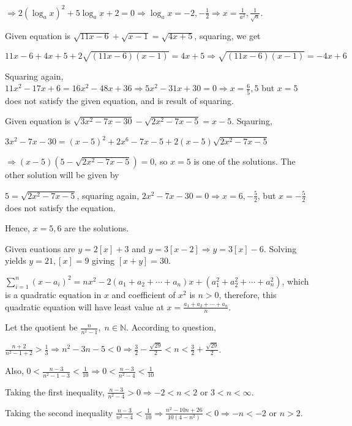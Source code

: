   $\Rightarrow 2(\log_ax)^2 + 5\log_ax + 2 = 0 \Rightarrow \log_ax = -2, -\frac{1}{2}\Rightarrow x =
  \frac{1}{a^2}, \frac{1}{\sqrt{a}}$.
\item Given equation is $\sqrt{11x - 6} + \sqrt{x - 1} = \sqrt{4x + 5}$, squaring, we get

  $11x - 6 + 4x + 5 + 2\sqrt{(11x - 6)(x - 1)} = 4x + 5 \Rightarrow \sqrt{(11x - 6)(x - 1)} = -4x + 6$

  Squaring again, $11x^2 - 17x + 6 = 16x^2 - 48x + 36 \Rightarrow 5x^2 - 31x + 30 = 0\Rightarrow x =
  \frac{6}{5}, 5$ but $x = 5$ does not satisfy the given equation, and is result of squaring.
\item Given equation is $\sqrt{3x^2 - 7x - 30} - \sqrt{2x^2 - 7x - 5} = x - 5$. Sqauring,

  $3x^2 - 7x - 30 = (x - 5)^2 + 2x^6 - 7x - 5 + 2(x - 5)\sqrt{2x^2 - 7x - 5}$

  $\Rightarrow (x - 5)(5 - \sqrt{2x^2 - 7x - 5}) = 0$, so $x = 5$ is one of the solutions. The other
  solution will be given by

  $5 = \sqrt{2x^2 - 7x - 5}$, squaring again, $2x^2 - 7x - 30 = 0\Rightarrow x = 6, -\frac{5}{2}$, but $x =
  -\frac{5}{2}$ does not satisfy the equation.

  Hence, $x = 5, 6$ are the solutions.
\item Given euations are $y = 2[x] + 3$ and $y = 3[x - 2] \Rightarrow y = 3[x] - 6$. Solving yields $y = 21,
  [x] = 9$ giving $[x + y] = 30$.
\item $\displaystyle\sum_{i=1}^n(x - a_i)^2 = nx^2 - 2(a_1 + a_2 + \cdots + a_n)x + (a_1^2 + a_2^2 + \cdots
  + a_n^2)$, which is a quadratic equation in $x$ and coefficient of $x^2$ is $n > 0$, therefore, this
  quadratic equation will have least value at $x = \frac{a_1 + a_2 + \cdots + a_n}{n}$.
\item Let the quotient be $\frac{n}{n^2 - 1},\;n\in\mathbb{N}$. According to question,

  $\frac{n + 2}{n^2 - 1 + 2}> \frac{1}{3}\Rightarrow n^2 - 3n - 5 < 0 \Rightarrow \frac{3}{2} -
  \frac{\sqrt{29}}{2} < n < \frac{3}{2} + \frac{\sqrt{29}}{2}$.

  Also, $0<\frac{n - 3}{n^2 - 1 - 3} < \frac{1}{10}\Rightarrow 0 < \frac{n - 3}{n^2 - 4} < \frac{1}{10}$

  Taking the first inequality, $\frac{n - 3}{n^2 - 4} > 0 \Rightarrow -2 < n < 2$ or $3 < n < \infty$.

  Taking the second inequality $\frac{n - 3}{n^2 - 4} < \frac{1}{10} \Rightarrow \frac{n^2 - 10n + 26}{10(4
    - n^2)} < 0 \Rightarrow -n < -2$  or $n > 2$.

